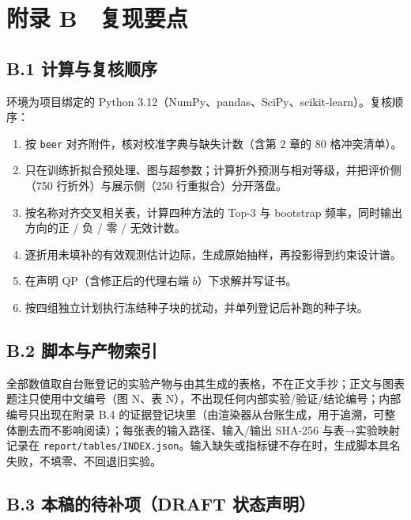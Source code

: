 \documentclass[11pt,a4paper]{article}
\providecommand{\tightlist}{%
  \setlength{\itemsep}{0pt}\setlength{\parskip}{0pt}}
\begin{document}
\section*{附录
B　复现要点}\label{ux9644ux5f55-b-ux590dux73b0ux8981ux70b9}

\subsection*{B.1
计算与复核顺序}\label{b.1-ux8ba1ux7b97ux4e0eux590dux6838ux987aux5e8f}

环境为项目绑定的 Python
3.12（NumPy、pandas、SciPy、scikit-learn）。复核顺序：

\begin{enumerate}
\def\labelenumi{\arabic{enumi}.}
\tightlist
\item
  按 \texttt{beer} 对齐附件，核对校准字典与缺失计数（含第 2 章的 80
  格冲突清单）。
\item
  只在训练折拟合预处理、图与超参数；计算折外预测与相对等级，并把评价侧（750
  行折外）与展示侧（250 行重拟合）分开落盘。
\item
  按名称对齐交叉相关表，计算四种方法的 Top-3 与 bootstrap
  频率，同时输出方向的正 / 负 / 零 / 无效计数。
\item
  逐折用未填补的有效观测估计边际，生成原始抽样，再投影得到约束设计谱。
\item
  在声明 QP（含修正后的代理右端 \(b\)）下求解并写证书。
\item
  按四组独立计划执行冻结种子块的扰动，并单列登记后补跑的种子块。
\end{enumerate}

\subsection*{B.2
脚本与产物索引}\label{b.2-ux811aux672cux4e0eux4ea7ux7269ux7d22ux5f15}

全部数值取自台账登记的实验产物与由其生成的表格，不在正文手抄；正文与图表题注只使用中文编号（图
N、表 N），不出现任何内部实验/验证/结论编号；内部编号只出现在附录 B.4
的证据登记块里（由渲染器从台账生成，用于追溯，可整体删去而不影响阅读）；每张表的输入路径、输入/输出
SHA-256 与表→实验映射记录在
\texttt{report/\allowbreak{}tables/\allowbreak{}INDEX.json}。输入缺失或指标键不存在时，生成脚本具名失败，不填零、不回退旧实验。

\subsection*{B.3 本稿的待补项（DRAFT
状态声明）}\label{b.3-ux672cux7a3fux7684ux5f85ux8865ux9879draft-ux72b6ux6001ux58f0ux660e}
\end{document}
